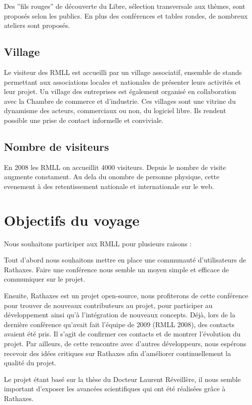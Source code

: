 \documentclass{rtxreport}
\begin{document}
Des ''fils rouges'' de découverte du Libre, sélection transversale aux thèmes, sont proposés selon les publics. En plus des conférences et tables rondes, de nombreux ateliers sont proposés.

\section{Village}

Le visiteur des RMLL est accueilli par un village associatif, ensemble de stands permettant aux associations locales et nationales de présenter leurs activités et leur projet. Un village des entreprises est également organisé en collaboration avec la Chambre de commerce et d'industrie. Ces villages sont une vitrine du dynamisme des acteurs, commerciaux ou non, du logiciel libre. Ils rendent possible une prise de contact informelle et conviviale.

\section{Nombre de visiteurs}
En 2008 les RMLL on accueillit 4000 visiteurs. Depuis le nombre de visite augmente constament.
Au dela du onombre de personne physique, cette evenement à des retentissement nationale et internationale sur le web. 


\chapter{Objectifs du voyage}
Nous souhaitons participer aux RMLL pour plusieurs raisons :

Tout d'abord nous souhaitons mettre en place une communauté d'utilisateurs de Rathaxes. Faire une conférence nous semble un moyen simple et efficace de communiquer sur le projet.

Ensuite, Rathaxes est un projet open-source, nous profiterons de cette conférence pour trouver de nouveaux contributeurs au projet, pour participer au développement ainsi qu’à l’intégration de nouveaux concepts.
Déjà, lors de la dernière conférence qu'avait fait l'équipe de 2009 (RMLL 2008), des contacts avaient été pris. Il s'agit de confirmer ces contacts et de montrer l'évolution du projet.
Par ailleurs, de cette rencontre avec d'autres développeurs, nous espérons recevoir des idées critiques sur Rathaxes afin d'améliorer continuellement la qualité du projet.

Le projet étant basé sur la thèse du Docteur Laurent Réveillère, il nous semble important d'exposer les avancées scientifiques qui ont été réalisées grâce à Rathaxes.
\end{document}
